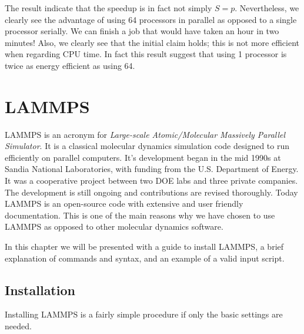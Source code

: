 \documentclass[twoside,english]{uiofysmaster}
\begin{document}
The result indicate that the speedup is in fact not simply $S=p$. 
Nevertheless, we clearly see the advantage of using 64 processors in parallel as opposed to a single processor serially. 
We can finish a job that would have taken an hour in two minutes!
Also, we clearly see that the initial claim holds; this is not more efficient when regarding CPU time. 
In fact this result suggest that using 1 processor is twice as energy efficient as using 64. 




\chapter{LAMMPS}

LAMMPS is an acronym for \textit{Large-scale Atomic/Molecular Massively Parallel Simulator}. 
It is a classical molecular dynamics simulation code designed to run efficiently on parallel computers. 
It's development began in the mid 1990s at Sandia National Laboratories, with funding from the U.S. Department of Energy. 
It was a cooperative project between two DOE labs and three private companies. 
The development is still ongoing and contributions are revised thoroughly. 
Today LAMMPS is an open-source code with extensive and user friendly documentation. 
This is one of the main reasons why we have chosen to use LAMMPS as opposed to other molecular dynamics software. 

In this chapter we will be presented with a guide to install LAMMPS, a brief explanation of commands and syntax, and an example of a valid input script.
\section{Installation}
Installing LAMMPS is a fairly simple procedure if only the basic settings are needed.
\end{document}
